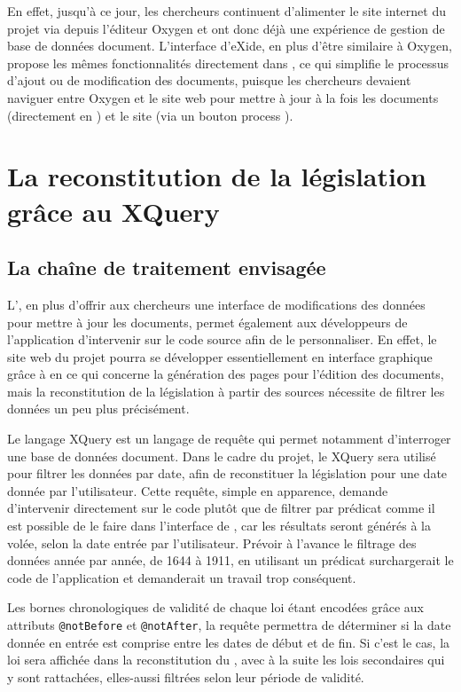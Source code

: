 En effet, jusqu'à ce jour, les chercheurs continuent d'alimenter le site internet du projet \LSC via \FTP depuis l'éditeur \XML Oxygen et ont donc déjà une expérience de gestion de base de données document. L'interface d'eXide, en plus d'être similaire à Oxygen, propose les mêmes fonctionnalités directement dans \tp, ce qui simplifie le processus d'ajout ou de modification des documents, puisque les chercheurs devaient naviguer entre Oxygen et le site web \LSC pour mettre à jour à la fois les documents (directement en \XML) et le site (via un bouton \og process \XML \fg). 

 \section{La reconstitution de la législation grâce au XQuery}
    \subsection{La chaîne de traitement envisagée}
L'\IDE, en plus d'offrir aux chercheurs une interface de modifications des données \XML pour mettre à jour les documents, permet également aux développeurs de l'application d'intervenir sur le code source afin de le personnaliser. En effet, le site web du projet pourra se développer essentiellement en interface graphique grâce à \tp en ce qui concerne la génération des pages \HTML pour l'édition des documents, mais la reconstitution de la législation à partir des sources nécessite de filtrer les données un peu plus précisément. 

Le langage XQuery est un langage de requête qui permet notamment d'interroger une base de données document. Dans le cadre du projet, le XQuery sera utilisé pour filtrer les données \XML par date, afin de reconstituer la législation pour une date donnée par l'utilisateur. Cette requête, simple en apparence, demande d'intervenir directement sur le code plutôt que de filtrer par prédicat comme il est possible de le faire dans l'interface de \tp, car les résultats seront générés à la volée, selon la date entrée par l'utilisateur. Prévoir à l'avance le filtrage des données année par année, de 1644 à 1911, en utilisant un prédicat surchargerait le code de l'application et demanderait un travail trop conséquent. 

Les bornes chronologiques de validité de chaque loi étant encodées grâce aux attributs \texttt{@notBefore} et \texttt{@notAfter}, la requête permettra de déterminer si la date donnée en entrée est comprise entre les dates de début et de fin. Si c'est le cas, la loi sera affichée dans la reconstitution du \cv, avec à la suite les lois secondaires qui y sont rattachées, elles-aussi filtrées selon leur période de validité.

